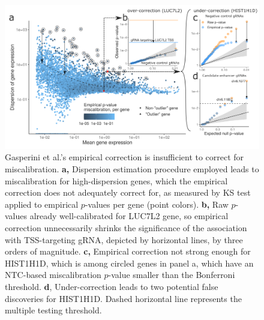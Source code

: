 \documentclass{nature}
\begin{document}
\begin{figure}[h!]
	\centering
	\includegraphics[width = \textwidth]{figures/FigureS1/FigureS1.png}
	\caption{Gasperini et al.'s empirical correction is insufficient to correct for miscalibration. \textbf{a,} Dispersion estimation procedure employed leads to miscalibration for high-dispersion genes, which the empirical correction does not adequately correct for, as measured by KS test applied to empirical $p$-values per gene (point colors). \textbf{b,} Raw $p$-values already well-calibrated for LUC7L2 gene, so empirical correction unnecessarily shrinks the significance of the association with TSS-targeting gRNA, depicted by horizontal lines, by three orders of magnitude. \textbf{c,} Empirical correction not strong enough for HIST1H1D, which is among circled genes in panel a, which have an NTC-based miscalibration $p$-value smaller than the Bonferroni threshold. \textbf{d}, Under-correction leads to two potential false discoveries for HIST1H1D. Dashed horizontal line represents the multiple testing threshold.}
	\label{fig:mosaicseq}
\end{figure}

\clearpage
\end{document}
